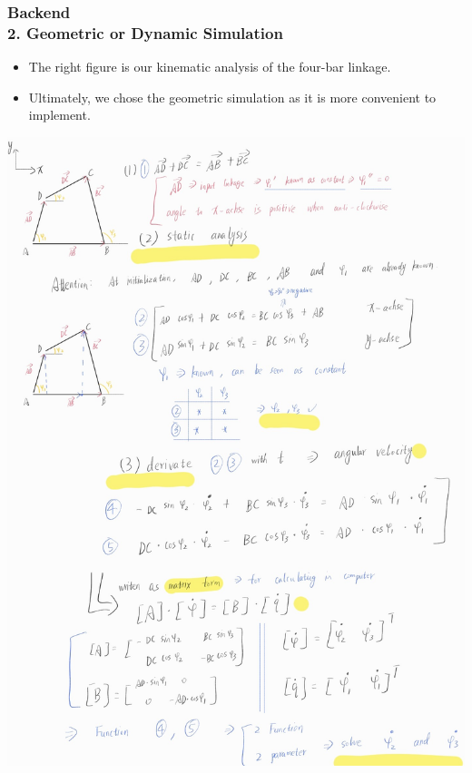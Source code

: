 \documentclass[ucs,10pt]{beamer}
\begin{document}
\begin{frame}
    \frametitle{Backend \\ \small \color{rwth-blue} 2. Geometric or Dynamic Simulation}
    \begin{minipage}{0.4\linewidth}
        \begin{itemize}
            \item The right figure is our kinematic analysis of the four-bar linkage.
            \item Ultimately, we chose the geometric simulation as it is more convenient to implement.
        \end{itemize}
    \end{minipage}
    \hspace{0.02\linewidth} %
    \begin{minipage}{0.5\linewidth}
        \begin{center}
            \includegraphics[width=\linewidth]{./Figures/dynamic_analysis_1.jpg}
        \end{center}
    \end{minipage}
\end{frame}
\end{document}
